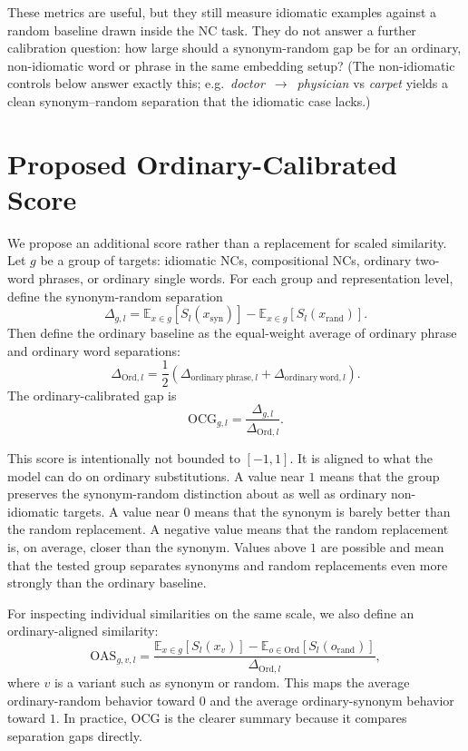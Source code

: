 \documentclass[11pt]{article}
\begin{document}
These metrics are useful, but they still measure idiomatic examples against a random baseline drawn
inside the NC task. They do not answer a further calibration question: how large should a
synonym-random gap be for an ordinary, non-idiomatic word or phrase in the same embedding setup?
(The non-idiomatic controls below answer exactly this; e.g.\ \emph{doctor}~$\rightarrow$~\emph{physician}
vs \emph{carpet} yields a clean synonym--random separation that the idiomatic case lacks.)

\section{Proposed Ordinary-Calibrated Score}

We propose an additional score rather than a replacement for scaled similarity. Let $g$ be a group
of targets: idiomatic NCs, compositional NCs, ordinary two-word phrases, or ordinary single words.
For each group and representation level, define the synonym-random separation
\begin{equation}
\Delta_{g,l} =
\mathbb{E}_{x \in g}[S_l(x_{\mathrm{syn}})] -
\mathbb{E}_{x \in g}[S_l(x_{\mathrm{rand}})].
\end{equation}
Then define the ordinary baseline as the equal-weight average of ordinary phrase and ordinary word
separations:
\begin{equation}
\Delta_{\mathrm{Ord},l} =
\frac{1}{2}\left(\Delta_{\mathrm{ordinary\ phrase},l}+
\Delta_{\mathrm{ordinary\ word},l}\right).
\end{equation}
The ordinary-calibrated gap is
\begin{equation}
\mathrm{OCG}_{g,l} = \frac{\Delta_{g,l}}{\Delta_{\mathrm{Ord},l}}.
\end{equation}

This score is intentionally not bounded to $[-1,1]$. It is aligned to what the model can do on
ordinary substitutions. A value near $1$ means that the group preserves the synonym-random
distinction about as well as ordinary non-idiomatic targets. A value near $0$ means that the
synonym is barely better than the random replacement. A negative value means that the random
replacement is, on average, closer than the synonym. Values above $1$ are possible and mean that
the tested group separates synonyms and random replacements even more strongly than the ordinary
baseline.

For inspecting individual similarities on the same scale, we also define an ordinary-aligned
similarity:
\begin{equation}
\mathrm{OAS}_{g,v,l} =
\frac{\mathbb{E}_{x \in g}[S_l(x_v)] -
\mathbb{E}_{o \in \mathrm{Ord}}[S_l(o_{\mathrm{rand}})]}
{\Delta_{\mathrm{Ord},l}},
\end{equation}
where $v$ is a variant such as synonym or random. This maps the average ordinary-random behavior
toward $0$ and the average ordinary-synonym behavior toward $1$. In practice, OCG is the clearer
summary because it compares separation gaps directly.
\end{document}
